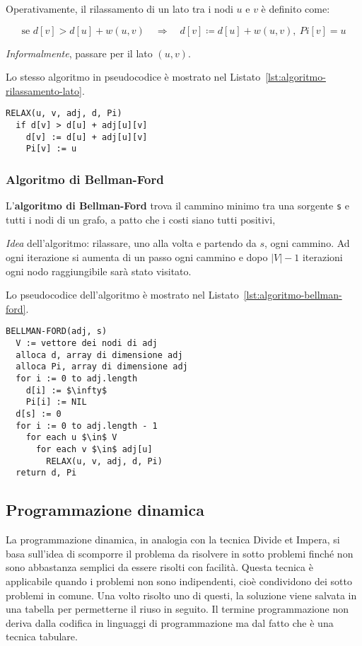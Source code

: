 \documentclass[italian, 10pt]{article}
\begin{document}
Operativamente, il rilassamento di un lato tra i nodi \(u\) e \(v\) è definito come:

\[\text{se } d[v] > d[u] + w(u, v) \quad \Rightarrow \quad d[v] \coloneqq d[u] + w(u, v), \ Pi[v] = u \]

\textit{Informalmente},  passare per il lato \((u, v)\).

\bigskip
Lo stesso algoritmo in pseudocodice è mostrato nel Listato~\ref{lst:algoritmo-rilassamento-lato}.

\begin{lstlisting}[float, style=pseudocode, caption={Algoritmo per il rilassamento di un lato}, label={lst:algoritmo-rilassamento-lato}]
RELAX(u, v, adj, d, Pi)
  if d[v] > d[u] + adj[u][v]
    d[v] := d[u] + adj[u][v]
    Pi[v] := u
\end{lstlisting}

\subsubsection{Algoritmo di Bellman-Ford}

L'\textbf{algoritmo di Bellman-Ford} trova il cammino minimo tra una sorgente \texttt{s} e tutti i nodi di un grafo, a patto che i costi siano tutti positivi,

\textit{Idea} dell'algoritmo:
rilassare, uno alla volta e partendo da \(s\), ogni cammino.
Ad ogni iterazione si aumenta di un passo ogni cammino e dopo \(|V|-1\) iterazioni ogni nodo raggiungibile sarà stato visitato.

\bigskip
Lo pseudocodice dell'algoritmo è mostrato nel Listato~\ref{lst:algoritmo-bellman-ford}.

\begin{lstlisting}[float, style=pseudocode, caption={Algoritmo di Bellman-Ford}, label={lst:algoritmo-bellman-ford}]
BELLMAN-FORD(adj, s)
  V := vettore dei nodi di adj
  alloca d, array di dimensione adj
  alloca Pi, array di dimensione adj
  for i := 0 to adj.length
    d[i] := $\infty$
    Pi[i] := NIL
  d[s] := 0
  for i := 0 to adj.length - 1
    for each u $\in$ V
      for each v $\in$ adj[u]
        RELAX(u, v, adj, d, Pi)
  return d, Pi
\end{lstlisting}

\subsection{Programmazione dinamica}

La programmazione dinamica, in analogia con la tecnica Divide et Impera, si basa sull'idea di scomporre il problema da risolvere in sotto problemi finché non sono abbastanza semplici da essere risolti con facilità.
Questa tecnica è applicabile quando i problemi non sono indipendenti, cioè condividono dei sotto problemi in comune.
Una volto risolto uno di questi, la soluzione viene salvata in una tabella per permetterne il riuso in seguito.
Il termine programmazione non deriva dalla codifica in linguaggi di programmazione ma dal fatto che è una tecnica tabulare.
\end{document}
